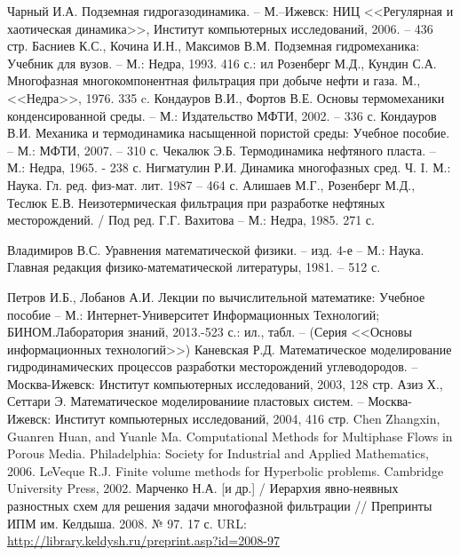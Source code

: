 \begin{thebibliography}{99}

 Чарный И.А. Подземная гидрогазодинамика. -- М.--Ижевск: НИЦ <<Регулярная и хаотическая динамика>>, Институт компьютерных исследований, 2006. -- 436 стр.
 Басниев К.С., Кочина И.Н., Максимов В.М. Подземная гидромеханика: Учебник для вузов. -- М.: Недра, 1993. 416 с.: ил
 Розенберг М.Д., Кундин С.А. Многофазная многокомпонентная фильтрация при добыче нефти и газа. М., <<Недра>>, 1976. 335 c.
 Кондауров В.И., Фортов В.Е. Основы термомеханики конденсированной среды. -- М.: Издательство МФТИ, 2002. -- 336 с.
 Кондауров В.И. Механика и термодинамика насыщенной пористой среды: Учебное пособие. -- М.: МФТИ, 2007. -- 310 с.
 Чекалюк Э.Б. Термодинамика нефтяного пласта. -- М.: Недра, 1965. - 238 с.
 Нигматулин Р.И. Динамика многофазных сред. Ч. I. М.: Наука. Гл. ред. физ-мат. лит. 1987 -- 464 с.
 Алишаев М.Г., Розенберг М.Д., Теслюк Е.В. Неизотермическая фильтрация при разработке нефтяных месторождений. / Под ред. Г.Г. Вахитова -- М.: Недра, 1985. 271 с.

 Владимиров В.С. Уравнения математической физики. -- изд. 4-е -- М.: Наука. Главная редакция физико-математической литературы, 1981. -- 512 с.

 Петров И.Б., Лобанов А.И. Лекции по вычислительной математике: Учебное пособие -- М.: Интернет-Университет Информационных Технологий; БИНОМ.Лаборатория знаний, 2013.-523 с.: ил., табл. -- (Серия <<Основы информационных технологий>>)
 Каневская Р.Д. Математическое моделирование гидродинамических процессов разработки месторождений углеводородов. -- Москва-Ижевск: Институт компьютерных исследований, 2003, 128 стр.
 Азиз Х., Сеттари Э. Математическое моделированиие пластовых систем. -- Москва-Ижевск: Институт компьютерных исследований, 2004, 416 стр.
 Chen Zhangxin, Guanren Huan, and Yuanle Ma. Computational Methods for Multiphase Flows in Porous Media. Philadelphia: Society for Industrial and Applied Mathematics, 2006.
 LeVeque R.J. Finite volume methods for Hyperbolic problems. Cambridge University Press, 2002.
 Марченко Н.А. [и др.] / Иерархия явно-неявных разностных схем для решения задачи многофазной фильтрации // Препринты ИПМ им. Келдыша. 2008. № 97. 17 с. URL: \url{http://library.keldysh.ru/preprint.asp?id=2008-97}


\end{thebibliography}
